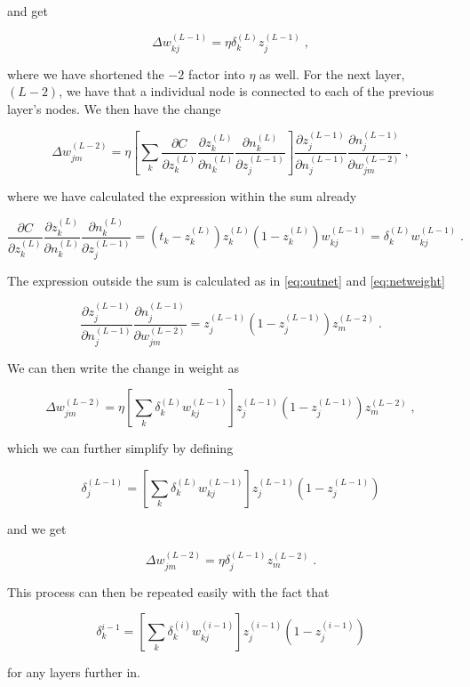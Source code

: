 and get

\begin{equation}
    \Delta w_{kj}^{(L-1)} = \eta \delta_k^{(L)} z_j^{(L-1)}  \; ,
\end{equation}

where we have shortened the $-2$ factor into $\eta$ as well. For the next layer, $(L-2)$, we have that a individual node is connected to each of the previous layer's nodes. We then have the change

\begin{equation}
    \Delta w_{jm}^{(L-2)} = \eta \left [ \sum_k \frac{\partial C}{\partial z_k^{(L)}}\frac{\partial z_k^{(L)}}{\partial n_k^{(L)}} \frac{\partial n_k^{(L)}}{\partial z_j^{(L-1)}}\right ] \frac{\partial z_j^{(L-1)}}{\partial n_j^{(L-1)}} \frac{\partial n_j^{(L-1)}}{\partial w_{jm}^{(L-2)}} \; ,
\end{equation}

where we have calculated the expression within the sum already

\begin{equation}
    \frac{\partial C}{\partial z_k^{(L)}}\frac{\partial z_k^{(L)}}{\partial n_k^{(L)}} \frac{\partial n_k^{(L)}}{\partial z_j^{(L-1)}} = \left ( t_k - z_k^{(L)} \right )z_k^{(L)}\left (1-z_k^{(L)} \right ) w_{kj}^{(L-1)} = \delta_k^{(L)} w_{kj}^{(L-1)} \; . 
\end{equation}

The expression outside the sum is calculated as in \ref{eq:outnet} and \ref{eq:netweight}

\begin{equation}
     \frac{\partial z_j^{(L-1)}}{\partial n_j^{(L-1)}} \frac{\partial n_j^{(L-1)}}{\partial w_{jm}^{(L-2)}} = z_j^{(L-1)} \left ( 1 - z_j^{(L-1)} \right  ) z_m^{(L-2)} \; .
\end{equation}

We can then write the change in weight as

\begin{equation}
   \Delta w_{jm}^{(L-2)} = \eta \left [ \sum_k \delta_k^{(L)} w_{kj}^{(L-1)} \right ] z_j^{(L-1)} \left ( 1 - z_j^{(L-1)} \right  ) z_m^{(L-2)} \; ,
\end{equation}

which we can further simplify by defining

\begin{equation}
    \delta_j^{(L-1)} = \left [ \sum_k \delta_k^{(L)} w_{kj}^{(L-1)} \right ] z_j^{(L-1)} \left ( 1 - z_j^{(L-1)} \right  )
\end{equation}

and we get

\begin{equation}
    \Delta w_{jm}^{(L-2)} = \eta \delta_j^{(L-1)} z_m^{(L-2)} \; .
\end{equation}

This process can then be repeated easily with the fact that

\begin{equation}
    \delta_k^{i-1} =  \left [ \sum_k \delta_k^{(i)} w_{kj}^{(i-1)} \right ] z_j^{(i-1)} \left ( 1 - z_j^{(i-1)} \right  ) 
\end{equation}

for any layers further in. 